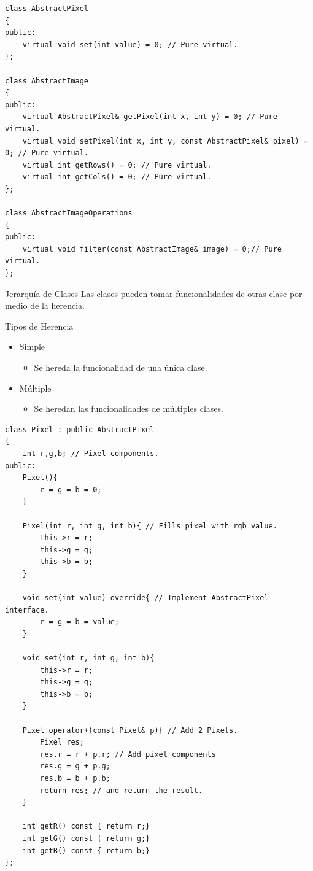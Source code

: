 \documentclass[aspectratio=169,presentation]{beamer}
\begin{document}
\begin{frame}[label={sec:orgbd93a48},fragile]{}
 \begin{verbatim}
class AbstractPixel
{
public:
	virtual void set(int value) = 0; // Pure virtual.
};

class AbstractImage
{
public:
	virtual AbstractPixel& getPixel(int x, int y) = 0; // Pure virtual.
	virtual void setPixel(int x, int y, const AbstractPixel& pixel) = 0; // Pure virtual.
	virtual int getRows() = 0; // Pure virtual.
	virtual int getCols() = 0; // Pure virtual.
};

class AbstractImageOperations
{
public:
	virtual void filter(const AbstractImage& image) = 0;// Pure virtual.
};
\end{verbatim}
\end{frame}
\begin{frame}[label={sec:org3221553}]{Jerarquía de Clases}
Las clases pueden tomar funcionalidades de otras clase por medio de la herencia.
\begin{block}{Tipos de Herencia}
\begin{itemize}
\item Simple
\begin{itemize}
\item Se hereda la funcionalidad de una única clase.
\end{itemize}
\item Múltiple
\begin{itemize}
\item Se heredan las funcionalidades de múltiples clases.
\end{itemize}
\end{itemize}
\end{block}
\end{frame}
\begin{frame}[label={sec:org7487945},fragile]{}
 \begin{verbatim}
class Pixel : public AbstractPixel
{
	int r,g,b; // Pixel components.
public:		
	Pixel(){
		r = g = b = 0;
	}
			
	Pixel(int r, int g, int b){ // Fills pixel with rgb value.
		this->r = r;
		this->g = g;
		this->b = b;
	}

	void set(int value) override{ // Implement AbstractPixel interface.
		r = g = b = value;
	}

	void set(int r, int g, int b){
		this->r = r;
		this->g = g;
		this->b = b;
	}
			
	Pixel operator+(const Pixel& p){ // Add 2 Pixels.
		Pixel res;
		res.r = r + p.r; // Add pixel components
		res.g = g + p.g;
		res.b = b + p.b;
		return res; // and return the result.
	}

	int getR() const { return r;}
	int getG() const { return g;}
	int getB() const { return b;}
};
\end{verbatim}
\end{frame}
\end{document}
